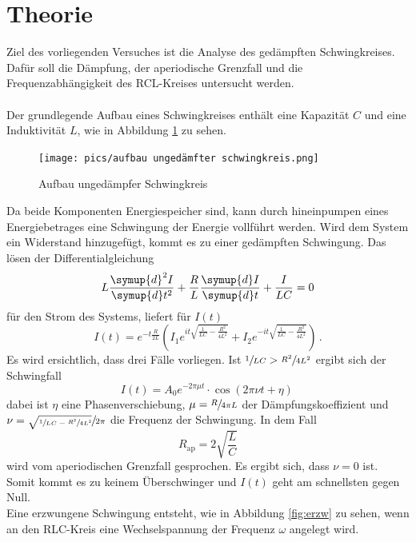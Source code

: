 \section{Theorie}
\label{sec:Theorie}
Ziel des vorliegenden Versuches ist die Analyse des gedämpften Schwingkreises.
Dafür soll die Dämpfung, der aperiodische Grenzfall und die Frequenzabhängigkeit des RCL-Kreises untersucht werden.\\
\\
Der grundlegende Aufbau eines Schwingkreises enthält eine Kapazität $C$ und eine Induktivität $L$, wie in Abbildung \ref{fig:unged} zu sehen.
\begin{figure}
    \centering
    \caption{Aufbau ungedämpfer Schwingkreis \cite{}} 
    \label{fig:unged}
    \texttt{[image: pics/aufbau ungedämfter schwingkreis.png]}
\end{figure}
Da beide Komponenten Energiespeicher sind, kann durch hineinpumpen eines Energiebetrages eine Schwingung der Energie vollführt werden.
Wird dem System ein Widerstand hinzugefügt, kommt es zu einer gedämpften Schwingung. Das lösen der Differentialgleichung
\begin{equation}
    L \frac{\symup{d}^2 I}{\symup{d} t^2} + \frac{R}{L} \frac{\symup{d} I}{\symup{d} t} + \frac{I}{LC}=0
\end{equation}
für den Strom des Systems, liefert für $I(t)$
\begin{equation}
    I(t)=e^{-t \frac{R}{2L}} \left(I_1 e^{i t \sqrt{\frac{1}{L C} - \frac{R^2}{4 L^2}}}+ I_2 e^{-i t \sqrt{\frac{1}{L C} - \frac{R^2}{4 L^2}}} \right) \, .
\end{equation}
Es wird ersichtlich, dass drei Fälle vorliegen. Ist $ \sfrac{1}{LC}> \sfrac{R^2}{4 L^2}$ ergibt sich der Schwingfall
\begin{equation}
    I(t)=A_0 e^{- 2 \pi \mu t} \cdot \cos(2 \pi \nu t + \eta) \, 
\end{equation}
dabei ist $\eta$ eine Phasenverschiebung, $\mu=\sfrac{R}{4 \pi L}$ der Dämpfungskoeffizient und $\nu=\sfrac{\sqrt{\sfrac{1}{L C}-\sfrac{R^2}{4 L^2}}}{2 \pi}$ die Frequenz der Schwingung.
In dem Fall 
\begin{equation}
    R_\text{ap}=2 \sqrt{\frac{L}{C}}
\end{equation}
wird vom aperiodischen Grenzfall gesprochen. Es ergibt sich, dass $\nu = 0$ ist. Somit kommt es zu keinem Überschwinger und $I(t)$ geht am schnellsten gegen Null.\\
Eine erzwungene Schwingung entsteht, wie in Abbildung \ref{fig:erzw} zu sehen, wenn an den RLC-Kreis eine Wechselspannung der Frequenz $\omega$ angelegt wird.
